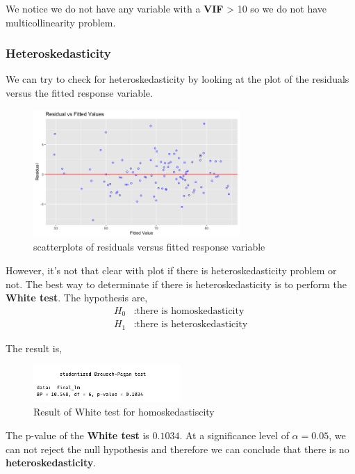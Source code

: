 We notice we do not have any variable with a \textbf{VIF} > 10 so we do not have multicollinearity problem.

\subsubsection{Heteroskedasticity}

We can try to check for heteroskedasticity by looking at the plot of the residuals versus the fitted response variable.

\begin{figure}[H]
	\centering
	\includegraphics[width=0.7\textwidth]{figures/models/residuals_vs_fitted_response.png}
	\caption{scatterplots of residuals versus fitted response variable}
	\label{fig:residuals_vs_fitted_response}
\end{figure}


However, it's not that clear with plot if there is heteroskedasticity problem or not. The best way to determinate if there is heteroskedasticity is to perform the \textbf{White test}. The hypothesis are,
\begin{align*}
	H_0&: \text{there is homoskedasticity} \\
	H_1&: \text{there is heteroskedasticity}
\end{align*}

The result is,
\begin{figure}[H]
	\centering
	\includegraphics[width=0.5\textwidth]{figures/models/white_test.png}
	\caption{Result of White test for homoskedastiscity}
	\label{fig:white_test}
\end{figure}

The p-value of the \textbf{White test} is $0.1034$. At a significance level of $\alpha = 0.05$, we can not reject the null hypothesis and therefore we can conclude that there is no \textbf{heteroskedasticity}.

